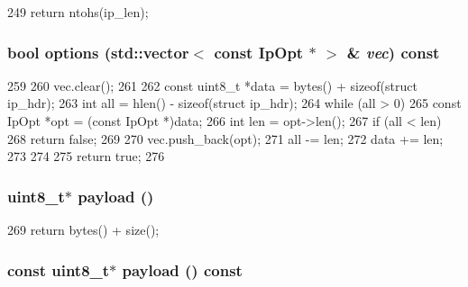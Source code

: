 \begin{DoxyCode}
249 { return ntohs(ip_len); }
\end{DoxyCode}
\hypertarget{structNet_1_1IpHdr_a0a9696ccdde553123aa20c1e2c63ccee}{
\subsubsection[{options}]{\setlength{\rightskip}{0pt plus 5cm}bool options ({\bf std::vector}$<$ const {\bf IpOpt} $\ast$ $>$ \& {\em vec}) const}}
\label{structNet_1_1IpHdr_a0a9696ccdde553123aa20c1e2c63ccee}



\begin{DoxyCode}
259 {
260     vec.clear();
261 
262     const uint8_t *data = bytes() + sizeof(struct ip_hdr);
263     int all = hlen() - sizeof(struct ip_hdr);
264     while (all > 0) {
265         const IpOpt *opt = (const IpOpt *)data;
266         int len = opt->len();
267         if (all < len)
268             return false;
269 
270         vec.push_back(opt);
271         all -= len;
272         data += len;
273     }
274 
275     return true;
276 }
\end{DoxyCode}
\hypertarget{structNet_1_1IpHdr_a79ce21e3572e587b71de7af1ac640b6f}{
\subsubsection[{payload}]{\setlength{\rightskip}{0pt plus 5cm}uint8\_\-t$\ast$ payload ()}}
\label{structNet_1_1IpHdr_a79ce21e3572e587b71de7af1ac640b6f}



\begin{DoxyCode}
269 { return bytes() + size(); }
\end{DoxyCode}
\hypertarget{structNet_1_1IpHdr_a5f0d069ddb9d067af9e94963bd1fc7a2}{
\subsubsection[{payload}]{\setlength{\rightskip}{0pt plus 5cm}const uint8\_\-t$\ast$ payload () const}}
\label{structNet_1_1IpHdr_a5f0d069ddb9d067af9e94963bd1fc7a2}



